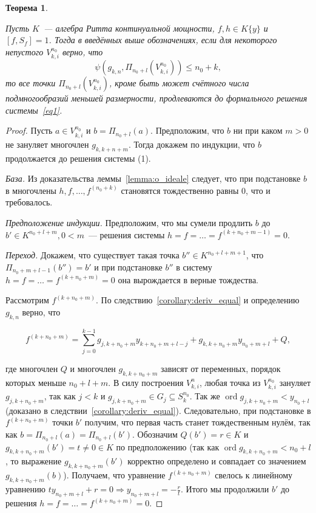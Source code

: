 \documentclass[16pt]{article}
\DeclareMathOperator{\ord}{ord}
\renewcommand{\le}{\leqslant} %
\theoremstyle{plain1}
\theoremstyle{plain2}
\theoremstyle{plain}
\newtheorem{theorem}{Теорема}
\theoremstyle{plain3}
\theoremstyle{definition}
\theoremstyle{remark}
\begin{document}
\begin{theorem}\label{theorem:general th1}

Пусть $K$~--- алгебра Ритта континуальной мощности, $f,h\in K\{y\}$ и $[f,S_f]=1$. Тогда в введённых выше обозначениях, если для некоторого непустого ${V}_{k,i}^{n_0}$ верно, что
\begin{equation}
\psi(g_{k,n},\Pi_{n_0+l}({V}_{k,i}^{n_0}))\le n_0+k,
\end{equation}
то все точки $\Pi_{n_0+l}({V}_{k,i}^{n_0})$, кроме быть может счётного числа подмногообразий меньшей размерности, продлеваются до формального решения системы~\eqref{eq1}.
\end{theorem}

\begin{proof}
Пусть $a\in {V}_{k,i}^{n_0}$ и $b=\Pi_{n_0+l}(a)$. Предположим, что $b$ ни при каком $m>0$ не зануляет многочлен $g_{k,k+n+m}$. Тогда докажем по индукции, что $b$ продолжается до решения системы (1).

\emph{База.} Из доказательства леммы~\ref{lemma:o_ideale} следует, что при подстановке $b$ в многочлены $h,f,\ldots,f^{(n_0+k)}$ становятся тождественно равны 0, что и требовалось.

\emph{Предположение индукции.} Предположим, что мы сумели продлить $b$ до $b'\in K^{n_0+l+m}, 0< m$~--- решения системы $h=f=\ldots=f^{(k+n_0+m-1)}=0$.

\emph{Переход.} Докажем, что существует такая точка $b''\in K^{n_0+l+m+1}$, что $\Pi_{n_0+m+l-1}(b'')=b'$ и при подстановке $b''$ в систему $h=f=\ldots=f^{(k+n_0+m)}=0$ она вырождается в верные тождества.

Рассмотрим $f^{(k+n_0+m)}$. По следствию~\ref{corollary:deriv_equal} и определению $g_{k,n}$ верно, что

$$
f^{(k+n_0+m)}=\sum\limits_{j=0}^{k-1} g_{j,k+n_0+m}y_{k+n_0+m+l -j}+g_{k,k+n_0+m}y_{n_0+m+l}  + Q,
$$

где многочлен $Q$ и многочлен $g_{k,k+n_0+m}$ зависят от переменных, порядок которых меньше $n_0+l+m$. В силу построения ${V}_{k,i}^n$, любая точка из ${V}_{k,i}^{n_0}$ зануляет $g_{j,k+n_0+m}$, так как $j < k$ и $g_{j,k+n_0+m}\in G_j\subseteq S_k^{n_0}$. Так же $\ord g_{j,k+n_0+m}<y_{n_0+l}$ (доказано в следствии~\ref{corollary:deriv_equal}). Следовательно, при подстановке в $f^{(k+n_0+m)}$ точки $b'$ получим, что первая часть станет тождественным нулём, так как $b=\Pi_{n_0+l}(a)=\Pi_{n_0+l}(b')$. Обозначим $Q(b')=r\in K$ и $g_{k,k+n_0+m}(b')=t\neq 0\in K$ по предположению (так как $\ord g_{k,k+n_0+m}< n_0+l$, то выражение $g_{k,k+n_0+m}(b')$ корректно определено и совпадает со значением $g_{k,k+n_0+m}(b)$). Получаем, что уравнение $f^{(k+n_0+m)}$ свелось к линейному уравнению $t y_{n_0+m+l}+r=0\Rightarrow y_{n_0+m+l}=-\frac{r}{t}$. Итого мы продолжили $b'$ до решения $h=f=\ldots=f^{(k+n_0+m)}=0$.


\end{proof}
\end{document}
